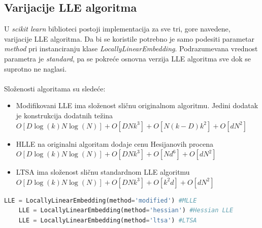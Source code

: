 

\subsection{Varijacije \textenglish{LLE} algoritma}
U {\it \textenglish{scikit learn}} biblioteci postoji implementacija za sve tri, gore navedene, varijacije \textenglish{LLE} algoritma. Da bi se koristile potrebno je samo podesiti parametar {\it \textenglish{method}} pri instanciranju klase {\it \textenglish{LocallyLinearEmbedding}}. Podrazumevana vrednost parametra je {\it \textenglish{standard}}, pa se pokre\' ce osnovna verzija \textenglish{LLE} algoritma sve dok se suprotno ne naglasi.\\
\\
Slo\v zenosti algoritama su slede\' ce:
\begin{itemize}
    \item Modifikovani \textenglish{LLE} ima slo\v zenost sli\v cnu originalnom algoritmu. Jedini dodatak je konstrukcija dodatnih te\v zina $O[D\log(k)N\log(N)] + O[DNk^{3}] +  O[N(k-D)k^{2}] + O[dN^{2}]$ 
    \item \textenglish{HLLE} na originalni algoritam dodaje cenu Hesijanovih procena $O[D\log(k)N\log(N)] + O[DNk^{3}] + O[Nd^{6}] + O[dN^{2}]$ 
    \item \textenglish{LTSA} ima slo\v zenost sli\v cnu standardnom \textenglish{LLE} algoritmu $O[D\log(k)N\log(N)] + O[DNk^{3}] + O[k^{2}d] + O[dN^{2}]$ 
\end{itemize}

\begin{english}
    \begin{lstlisting}[language=Python]
    LLE = LocallyLinearEmbedding(method='modified') #MLLE
    LLE = LocallyLinearEmbedding(method='hessian') #Hessian LLE
    LLE = LocallyLinearEmbedding(method='ltsa') #LTSA
    \end{lstlisting}
\end{english}

